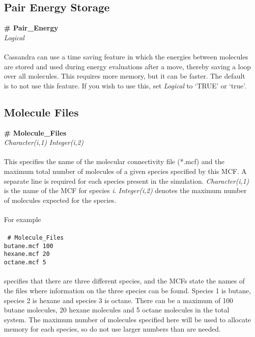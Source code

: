 \subsection{Pair Energy Storage}\label{sec:Pair_Energy}
{\bf \# Pair\_Energy} \\
{\it Logical} \\ \\
%
Cassandra can use a time saving feature in which the energies between
molecules are stored and used during energy evaluations after a move,
thereby saving a loop over all molecules. This requires more memory,
but it can be faster. The default is to not use 
this feature. If you wish to use this, set {\it Logical} to `TRUE' or `true'. 
%
%
%
%
\subsection{Molecule Files}\label{sec:Molecule_Files}
{\bf \# Molecule\_Files} \\
{\it Character(i,1) Integer(i,2)}  \\ \\
%
This specifies the name of the molecular connectivity file (*.mcf) and
the maximum total number of molecules of a given species specified by this MCF.
A separate line is required for each species present in the
simulation.  {\it Character(i,1)} is the name of the MCF for
species {\it i}. {\it Integer(i,2)} denotes the maximum number of
molecules expected for the species.  \\ \\
For example \\ \\
\texttt{
\# Molecule\_Files \\
butane.mcf 100 \\
hexane.mcf 20\\
octane.mcf 5} \\ \\
specifies that there are three different species, and the MCFs
state the names of the files where information on the three species
can be found. Species 1 is butane, species 2 is hexane and species 3
is octane. There can be a maximum of 100 butane molecules, 20 hexane
molecules and 5 octane molecules in the total system. The maximum
number of molecules specified here will be used to allocate memory for
each species, so do not use larger numbers than are needed. 
%
%
